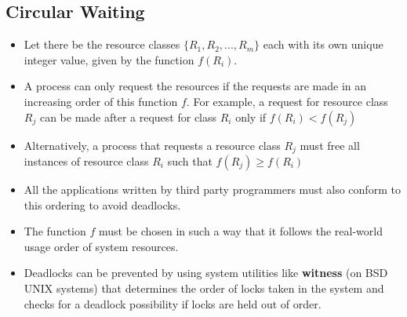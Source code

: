 \documentclass{article}
\theoremstyle{plain}
\theoremstyle{definition}
\begin{document}
\subsection{Circular Waiting}
\begin{itemize}
    \item Let there be the resource classes $\{ R_1, R_2, ..., R_m\}$ each with its own unique integer value, given by the function $f(R_i)$. 
    
    \item A process can only request the resources if the requests are made in an increasing order of this function $f$. For example, a request for resource class $R_j$ can be made after a request for class $R_i$ only if $f(R_i) < f(R_j)$
    
    \item Alternatively, a process that requests a resource class $R_j$ must free all instances of resource class $R_i$ such that $f(R_j) \ge f(R_i)$
    
    \item All the applications written by third party programmers must also conform to this ordering to avoid deadlocks.
    
    \item The function $f$ must be chosen in such a way that it follows the real-world usage order of system resources. 
    
    \item Deadlocks can be prevented by using system utilities like \textbf{witness} (on BSD UNIX systems) that determines the order of locks taken in the system and checks for a deadlock possibility if locks are held out of order. 
\end{itemize}
\end{document}
